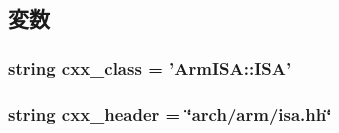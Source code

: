 \subsection{変数}
\hypertarget{classArmISA_1_1ArmISA_a58cd55cd4023648e138237cfc0822ae3}{
\subsubsection[{cxx\_\-class}]{\setlength{\rightskip}{0pt plus 5cm}string {\bf cxx\_\-class} = '{\bf ArmISA::ISA}'}}
\label{classArmISA_1_1ArmISA_a58cd55cd4023648e138237cfc0822ae3}
\hypertarget{classArmISA_1_1ArmISA_a17da7064bc5c518791f0c891eff05fda}{
\subsubsection[{cxx\_\-header}]{\setlength{\rightskip}{0pt plus 5cm}string {\bf cxx\_\-header} = \char`\"{}arch/arm/isa.hh\char`\"{}}}
\label{classArmISA_1_1ArmISA_a17da7064bc5c518791f0c891eff05fda}


